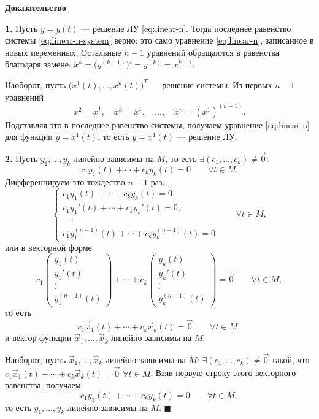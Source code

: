 \documentclass[12pt,a4paper]{article}
\numberwithin{equation}{section}
\newcommand{\vect}[1]{\vec{#1}}
\renewenvironment{proof}[1][Доказательство]{\begin{center}\textbf{#1}\end{center}}{\hfill$\blacksquare$\par}
\begin{document}
\begin{proof}
\textbf{1.} Пусть \(y=y(t)\) --- решение ЛУ \eqref{eq:linear-n}. Тогда последнее равенство системы \eqref{eq:linear-n-system} верно: это само уравнение \eqref{eq:linear-n}, записанное в новых переменных. Остальные \(n-1\) уравнений обращаются в равенства благодаря замене: \(\dot x^k=\bigl(y^{(k-1)}\bigr)'=y^{(k)}=x^{k+1}\).

Наоборот, пусть \(\bigl(x^1(t),\ldots,x^n(t)\bigr)^{T}\) --- решение системы. Из первых \(n-1\) уравнений
\[
x^2=\dot x^1,\quad x^3=\ddot x^1,\quad\ldots,\quad x^n=(x^1)^{(n-1)}.
\]
Подставляя это в последнее равенство системы, получаем уравнение \eqref{eq:linear-n} для функции \(y=x^1(t)\), то есть \(y=x^1(t)\) --- решение ЛУ.

\textbf{2.} Пусть \(y_1,\ldots,y_k\) линейно зависимы на \(M\), то есть \(\exists(c_1,\ldots,c_k)\neq\vect{0}\):
\[
c_1y_1(t)+\cdots+c_ky_k(t)=0\qquad\forall t\in M.
\]
Дифференцируем это тождество \(n-1\) раз:
\[
\begin{cases}
c_1y_1(t)+\cdots+c_ky_k(t)=0,\\
c_1y_1'(t)+\cdots+c_ky_k'(t)=0,\\
\quad\vdots\\
c_1y_1^{(n-1)}(t)+\cdots+c_ky_k^{(n-1)}(t)=0
\end{cases}
\qquad\forall t\in M,
\]
или в векторной форме
\[
c_1\begin{pmatrix}y_1(t)\\y_1'(t)\\\vdots\\y_1^{(n-1)}(t)\end{pmatrix}+\cdots+
c_k\begin{pmatrix}y_k(t)\\y_k'(t)\\\vdots\\y_k^{(n-1)}(t)\end{pmatrix}=\vect{0}
\qquad\forall t\in M,
\]
то есть
\[
c_1\vect{x}_1(t)+\cdots+c_k\vect{x}_k(t)=\vect{0}\qquad\forall t\in M,
\]
и вектор-функции \(\vect{x}_1,\ldots,\vect{x}_k\) линейно зависимы на \(M\).

Наоборот, пусть \(\vect{x}_1,\ldots,\vect{x}_k\) линейно зависимы на \(M\): \(\exists(c_1,\ldots,c_k)\neq\vect{0}\) такой, что \(c_1\vect{x}_1(t)+\cdots+c_k\vect{x}_k(t)=\vect{0}\) \(\forall t\in M\). Взяв первую строку этого векторного равенства, получаем
\[
c_1y_1(t)+\cdots+c_ky_k(t)=0\qquad\forall t\in M,
\]
то есть \(y_1,\ldots,y_k\) линейно зависимы на \(M\).
\end{proof}
\end{document}
